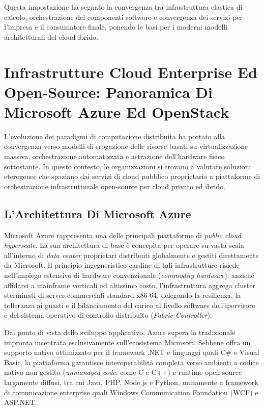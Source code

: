 \documentclass[11pt, a4paper]{article}
\begin{document}
Questa impostazione ha segnato la convergenza tra infrastruttura elastica di calcolo, orchestrazione dei componenti software e convergenza dei servizi per l'impresa e il consumatore finale, ponendo le basi per i moderni modelli architetturali del cloud ibrido.


\section{Infrastrutture Cloud Enterprise Ed Open-Source: Panoramica Di Microsoft Azure Ed OpenStack}

L'evoluzione dei paradigmi di computazione distribuita ha portato alla convergenza verso modelli di erogazione delle risorse basati su virtualizzazione massiva, orchestrazione automatizzata e astrazione dell'hardware fisico sottostante. In questo contesto, le organizzazioni si trovano a valutare soluzioni eterogenee che spaziano dai servizi di cloud pubblico proprietario a piattaforme di orchestrazione infrastrutturale open-source per cloud privato ed ibrido.

\subsection{L'Architettura Di Microsoft Azure}

Microsoft Azure rappresenta una delle principali piattaforme di \emph{public cloud hyperscale}. La sua architettura di base è concepita per operare su vasta scala all'interno di \emph{data center} proprietari distribuiti globalmente e gestiti direttamente da Microsoft. Il principio ingegneristico cardine di tali infrastrutture risiede nell'impiego estensivo di hardware convenzionale (\emph{commodity hardware}): anziché affidarsi a mainframe verticali ad altissimo costo, l'infrastruttura aggrega cluster sterminati di server commerciali standard x86-64, delegando la resilienza, la tolleranza ai guasti e il bilanciamento del carico al livello software dell'ipervisore e del sistema operativo di controllo distribuito (\emph{Fabric Controller}).

Dal punto di vista dello sviluppo applicativo, Azure supera la tradizionale impronta incentrata esclusivamente sull'ecosistema Microsoft. Sebbene offra un supporto nativo ottimizzato per il framework .NET e linguaggi quali C\# e Visual Basic, la piattaforma garantisce interoperabilità completa verso ambienti a codice nativo non gestito (\emph{unmanaged code}, come C e C++) e runtime open-source largamente diffusi, tra cui Java, PHP, Node.js e Python, unitamente a framework di comunicazione enterprise quali Windows Communication Foundation (WCF) e ASP.NET.
\end{document}

